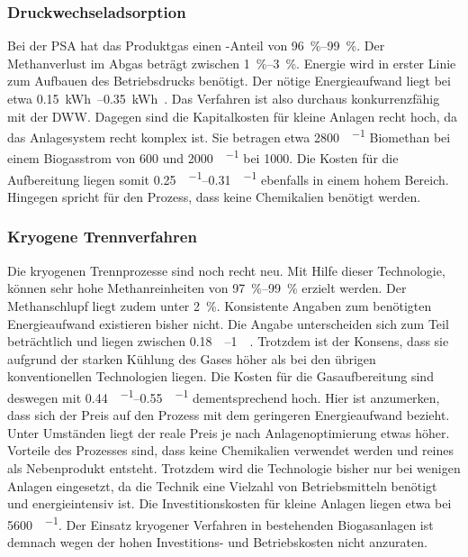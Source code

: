 \subsubsection{Druckwechseladsorption}
Bei der \gls{PSA} hat das Produktgas einen -Anteil von \SIrange{96}{99}{\percent}. Der Methanverlust im Abgas beträgt zwischen \SIrange{1}{3}{\percent}. Energie wird in erster Linie zum Aufbauen des Betriebsdrucks benötigt. Der nötige Energieaufwand liegt bei etwa \SIrange{0,15}{0,35}{\kWh\normvol}. Das Verfahren ist also durchaus konkurrenzfähig mit der \gls{DWW}. Dagegen sind die Kapitalkosten für kleine Anlagen recht hoch, da das Anlagesystem recht komplex ist. Sie betragen etwa \SI{2800}{\sieuro\per\normvolh} Biomethan bei einem Biogasstrom von \SI{600}{\normvolh} und \SI{2000}{\sieuro\per\normvolh} bei \SI{1000}{\normvolh}. Die Kosten für die Aufbereitung liegen somit \SIrange{0,25}{0,31}{\sieuro\per\normvol} ebenfalls in einem hohem Bereich. Hingegen spricht für den Prozess, dass keine Chemikalien benötigt werden. \parencite{AONC2019} \parencite{BHPT13} \parencite{dena2019} \parencite{DSW15} \parencite{KGKK2019} \parencite{Coll17}


\subsubsection{Kryogene Trennverfahren}
Die kryogenen Trennprozesse sind noch recht neu. Mit Hilfe dieser Technologie, können sehr hohe Methanreinheiten von \SIrange{97}{99}{\percent} erzielt werden. Der Methanschlupf liegt zudem unter \SI{2}{\percent}. Konsistente Angaben zum benötigten Energieaufwand existieren bisher nicht. Die Angabe unterscheiden sich zum Teil beträchtlich und liegen zwischen \SIrange{0,18}{1}{\kwh\normvol}. Trotzdem ist der Konsens, dass sie aufgrund der starken Kühlung des Gases höher als bei den übrigen konventionellen Technologien liegen. Die Kosten für die Gasaufbereitung sind deswegen mit \SIrange{0,44}{0,55}{\sieuro\per\normvol} dementsprechend hoch. Hier ist anzumerken, dass sich der Preis auf den Prozess mit dem geringeren Energieaufwand bezieht. Unter Umständen liegt der reale Preis je nach Anlagenoptimierung etwas höher. Vorteile des Prozesses sind, dass keine Chemikalien verwendet werden und reines  als Nebenprodukt entsteht. Trotzdem wird die Technologie bisher nur bei wenigen Anlagen eingesetzt, da die Technik eine Vielzahl von Betriebsmitteln benötigt und energieintensiv ist. Die Investitionskosten für kleine Anlagen liegen etwa bei \SI{5600}{\sieuro\per\normvolh}. Der Einsatz kryogener Verfahren in bestehenden Biogasanlagen ist demnach wegen der hohen Investitions- und Betriebskosten nicht anzuraten. \parencite{AONC2019} \parencite{Emp18} \parencite{KGKK2019}



